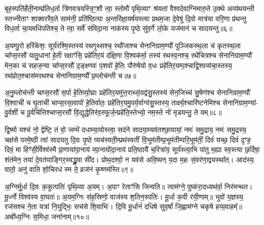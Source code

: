 बृह॒स्पति॑र्\mbox{}हेती॒नाम्प्र॑तिध॒र्ता त्रि॑णवत्रयस्त्रि॒ꣳ॒शौ त्वा॒ स्तोमौ॑ पृथि॒व्याꣳ श्र॑यतां वैश्वदेवाग्निमारु॒ते उ॒क्थे अव्य॑थयन्ती स्तभ्नीताꣳ शाक्वररैव॒ते साम॑नी॒ प्रति॑ष्ठित्या अ॒न्तरि॑क्षा॒यर्\mbox{}ष॑यस्त्वा प्रथम॒जा दे॒वेषु॑ दि॒वो मात्र॑या वरि॒णा प्र॑थन्तु विध॒र्ता चा॒यमधि॑पतिश्च॒ ते त्वा॒ सर्वे॑ संविदा॒ना नाक॑स्य पृ॒ष्ठे सु॑व॒र्गे लो॒के यज॑मानं च सादयन्तु॥६॥

{\anuvakamend[{प्र॒तीची॒ दिङ्म॒रुत॑स्ते दे॒वा अधि॑पतयश्चत्वारि॒ꣳ॒शच्च॑॥२॥}]}

अ॒यम्पु॒रो हरि॑केशः॒ सूर्य॑रश्मि॒स्तस्य॑ रथगृ॒थ्सश्च॒ रथौ॑जाश्च सेनानिग्राम॒ण्यौ॑ पुञ्जिकस्थ॒ला च॑ कृतस्थ॒ला चा᳚प्स॒रसौ॑ यातु॒धाना॑ हे॒ती रक्षाꣳ॑सि॒ प्रहे॑तिर॒यं द॑क्षि॒णा वि॒श्वक॑र्मा॒ तस्य॑ रथस्व॒नश्च॒ रथे॑चित्रश्च सेनानिग्राम॒ण्यौ॑ मेन॒का च॑ सहज॒न्या चा᳚प्स॒रसौ॑ द॒ङ्क्ष्णवः॑ प॒शवो॑ हे॒तिः पौरु॑षेयो व॒धः प्रहे॑तिर॒यम्प॒श्चाद्वि॒श्वव्य॑चा॒स्तस्य॒ रथ॑प्रोत॒श्चास॑मरथश्च सेनानिग्राम॒ण्यौ᳚ प्र॒म्लोच॑न्ती च॥७॥

अ॒नु॒म्लोच॑न्ती चाप्स॒रसौ॑ स॒र्पा हे॒तिर्व्या॒घ्राः प्रहे॑तिर॒यमु॑त्त॒राथ्सं॒यद्व॑सु॒स्तस्य॑ सेन॒जिच्च॑ सु॒षेण॑श्च सेनानिग्राम॒ण्यौ॑ वि॒श्वाची॑ च घृ॒ताची॑ चाप्स॒रसा॒वापो॑ हे॒तिर्वातः॒ प्रहे॑तिर॒यमु॒पर्य॒र्वाग्व॑सु॒स्तस्य॒ तार्क्ष्य॒श्चारि॑ष्टनेमिश्च सेनानिग्राम॒ण्या॑- वु॒र्वशी॑ च पू॒र्वचि॑त्तिश्चाप्स॒रसौ॑ वि॒द्युद्धे॒तिर॑व॒स्फूर्ज॒न्प्रहे॑ति॒स्तेभ्यो॒ नम॒स्ते नो॑ मृडयन्तु॒ ते यम्॥८॥

द्वि॒ष्मो यश्च॑ नो॒ द्वेष्टि॒ तं वो॒ जम्भे॑ दधाम्या॒योस्त्वा॒ सद॑ने सादया॒म्यव॑तश्छा॒यायां॒ नमः॑ समु॒द्राय॒ नमः॑ समु॒द्रस्य॒ चक्ष॑से परमे॒ष्ठी त्वा॑ सादयतु दि॒वः पृ॒ष्ठे व्यच॑स्वती॒म्प्रथ॑स्वतीं वि॒भूम॑तीम्प्र॒भूम॑तीम्परि॒भूम॑तीं॒ दिवं॑ यच्छ॒ दिवं॑ दृꣳह॒ दिवं॒ मा हिꣳ॑सी॒र्विश्व॑स्मै प्रा॒णाया॑पा॒नाय॑ व्या॒नायो॑दा॒नाय॑ प्रति॒ष्ठायै॑ च॒रित्रा॑य॒ सूर्य॑स्त्वा॒भि पा॑तु म॒ह्या स्व॒स्त्या छ॒र्दिषा॒ शंत॑मेन॒ तया॑ दे॒वत॑याङ्गिर॒स्वद्ध्रु॒वा सी॑द। प्रोथ॒दश्वो॒ न यव॑से अवि॒ष्यन् य॒दा म॒हः सं॒वर॑णा॒द्व्यस्था᳚त्। आद॑स्य॒ वातो॒ अनु॑ वाति शो॒चिरध॑ स्म ते॒ व्रज॑नं कृ॒ष्णम॑स्ति॥९॥

{\anuvakamend[{प्र॒म्लोच॑न्ती च॒ यꣴ स्व॒स्त्याष्टाविꣳ॑शतिश्च॥३॥}]}

अ॒ग्निर्मू॒र्धा दि॒वः क॒कुत्पतिः॑ पृथि॒व्या अ॒यम्। अ॒पाꣳ रेताꣳ॑सि जिन्वति॥ त्वाम॑ग्ने॒ पुष्क॑रा॒दध्यथ॑र्वा॒ निर॑मन्थत। मू॒र्ध्नो विश्व॑स्य वा॒घतः॑॥ अ॒यम॒ग्निः स॑ह॒स्रिणो॒ वाज॑स्य श॒तिन॒स्पतिः॑। मू॒र्धा क॒वी र॑यी॒णाम्॥ भुवो॑ य॒ज्ञस्य॒ रज॑सश्च ने॒ता यत्रा॑ नि॒युद्भिः॒ सच॑से शि॒वाभिः॑। दि॒वि मू॒र्धानं॑ दधिषे सुव॒र्\mbox{}षां जि॒ह्वाम॑ग्ने चकृषे हव्य॒वाहम्᳚॥ अबो᳚ध्य॒ग्निः स॒मिधा॒ जना॑नाम्॥१०॥

